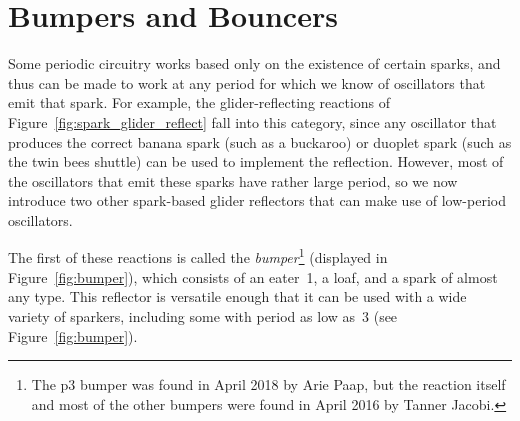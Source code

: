 


\section{Bumpers and Bouncers}\label{sec:bumper_bouncer}

Some periodic circuitry works based only on the existence of certain sparks, and thus can be made to work at any period for which we know of oscillators that emit that spark. For example, the glider-reflecting reactions of Figure~\ref{fig:spark_glider_reflect} fall into this category, since any oscillator that produces the correct banana spark (such as a buckaroo) or duoplet spark (such as the twin bees shuttle) can be used to implement the reflection. However, most of the oscillators that emit these sparks have rather large period, so we now introduce two other spark-based glider reflectors that can make use of low-period oscillators.

The first of these reactions is called the \emph{bumper}\footnote{The p$3$ bumper was found in April 2018 by Arie Paap, but the reaction itself and most of the other bumpers were found in April 2016 by Tanner Jacobi.} (displayed in Figure~\ref{fig:bumper}), which consists of an eater~1, a loaf, and a spark of almost any type. This reflector is versatile enough that it can be used with a wide variety of sparkers, including some with period as low as~$3$ (see Figure~\ref{fig:bumper}).

